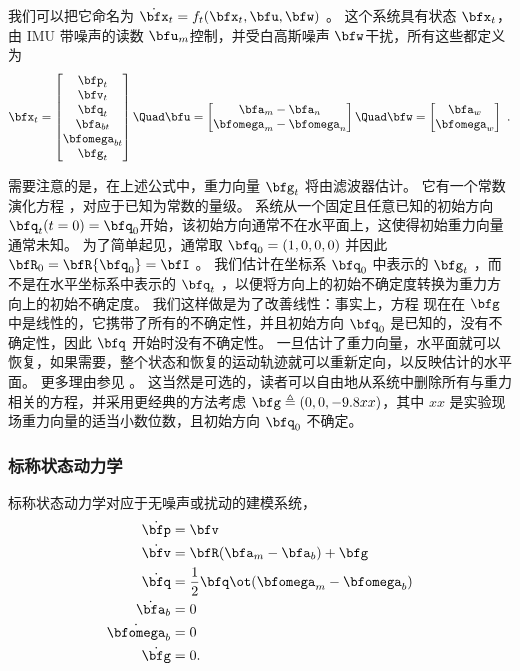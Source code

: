 %
我们可以把它命名为 $\dot\bfx_t=f_t(\bfx_t,\bfu,\bfw)$ 。 
这个系统具有状态 $\bfx_t$，由 IMU 带噪声的读数 $\bfu_m$控制，并受白高斯噪声 $\bfw$干扰，所有这些都定义为
%
\begin{equation}
\bfx_t = \begin{bmatrix}
\bfp_t \\ \bfv_t \\ \bfq_t \\ \bfa_{bt} \\ \bfomega_{bt} \\ \bfg_t
\end{bmatrix} 
\Quad
\bfu = \begin{bmatrix}
\bfa_m - \bfa_n \\ \bfomega_m - \bfomega_n
\end{bmatrix}
\Quad
\bfw = \begin{bmatrix}
\bfa_w \\ \bfomega_w
\end{bmatrix}~.
\end{equation}
%

\bigskip
需要注意的是，在上述公式中，重力向量 $\bfg_t$ 将由滤波器估计。 
它有一个常数演化方程 ，对应于已知为常数的量级。 
系统从一个固定且任意已知的初始方向 $\bfq_t(t=0)=\bfq_0$开始，该初始方向通常不在水平面上，这使得初始重力向量通常未知。 
为了简单起见，通常取 $\bfq_0=(1, 0, 0, 0)$ 并因此 $\bfR_0=\bfR\{\bfq_0\}=\bfI$ 。 
我们估计在坐标系 $\bfq_0$ 中表示的 $\bfg_t$ ，而不是在水平坐标系中表示的 $\bfq_t$ ，以便将方向上的初始不确定度转换为重力方向上的初始不确定度。 
我们这样做是为了改善线性：事实上，方程  现在在 $\bfg$中是线性的，它携带了所有的不确定性，并且初始方向 $\bfq_0$ 是已知的，没有不确定性，因此 $\bfq$ 开始时没有不确定性。 
一旦估计了重力向量，水平面就可以恢复，如果需要，整个状态和恢复的运动轨迹就可以重新定向，以反映估计的水平面。 
更多理由参见 \citep{LUPTON-09} 。 
这当然是可选的，读者可以自由地从系统中删除所有与重力相关的方程，并采用更经典的方法考虑 $\bfg\triangleq(0,0,-9.8xx)$，其中 $xx$ 是实验现场重力向量的适当小数位数，且初始方向 $\bfq_0$ 不确定。



\subsubsection{标称状态动力学}

标称状态动力学对应于无噪声或扰动的建模系统，
%
\begin{subequations}
%
\begin{align}
\dot\bfp &= \bfv \label{equ:pdot}\\
\dot\bfv &= \bfR(\bfa_m - \bfa_b) + \bfg \label{equ:vdot}\\
\dot{\bfq} &= \frac{1}{2}\bfq\ot(\bfomega_m - \bfomega_b) \\
\dot\bfa_b &= 0 \\
\dot\bfomega_b &= 0 \\
\dot\bfg &= 0 .
\end{align}%
\end{subequations}
%




